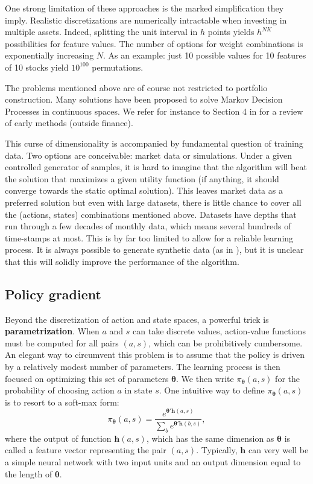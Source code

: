 \documentclass[]{krantz}
\theoremstyle{definition}
\theoremstyle{definition}
\theoremstyle{definition}
\theoremstyle{remark}
\begin{document}
One strong limitation of these approaches is the marked simplification
they imply. Realistic discretizations are numerically intractable when
investing in multiple assets. Indeed, splitting the unit interval in
\(h\) points yields \(h^{NK}\) possibilities for feature values. The
number of options for weight combinations is exponentially increasing
\(N\). As an example: just 10 possible values for 10 features of 10
stocks yield \(10^{100}\) permutations.

The problems mentioned above are of course not restricted to portfolio
construction. Many solutions have been proposed to solve Markov Decision
Processes in continuous spaces. We refer for instance to Section 4 in
\citet{powell2011review} for a review of early methods (outside
finance).

This curse of dimensionality is accompanied by fundamental question of
training data. Two options are conceivable: market data or simulations.
Under a given controlled generator of samples, it is hard to imagine
that the algorithm will beat the solution that maximizes a given utility
function (if anything, it should converge towards the static optimal
solution). This leaves market data as a preferred solution but even with
large datasets, there is little chance to cover all the (actions,
states) combinations mentioned above. Datasets have depths that run
through a few decades of monthly data, which means several hundreds of
time-stamps at most. This is by far too limited to allow for a reliable
learning process. It is always possible to generate synthetic data (as
in \citet{yu2019model}), but it is unclear that this will solidly
improve the performance of the algorithm.

\hypertarget{policy-gradient}{%
\subsection{Policy gradient}\label{policy-gradient}}

Beyond the discretization of action and state spaces, a powerful trick
is \textbf{parametrization}. When \(a\) and \(s\) can take discrete
values, action-value functions must be computed for all pairs \((a,s)\),
which can be prohibitively cumbersome. An elegant way to circumvent this
problem is to assume that the policy is driven by a relatively modest
number of parameters. The learning process is then focused on optimizing
this set of parameters \(\boldsymbol{\theta}\). We then write
\(\pi_{\boldsymbol{\theta}}(a,s)\) for the probability of choosing
action \(a\) in state \(s\). One intuitive way to define
\(\pi_{\boldsymbol{\theta}}(a,s)\) is to resort to a soft-max form:
\begin{equation}
\label{eq:policyex}
\pi_{\boldsymbol{\theta}}(a,s) = \frac{e^{\boldsymbol{\theta}'\textbf{h}(a,s)}}{\sum_{b}e^{\boldsymbol{\theta}'\textbf{h}(b,s)}},
\end{equation} where the output of function \(\textbf{h}(a,s)\), which
has the same dimension as \(\boldsymbol{\theta}\) is called a feature
vector representing the pair \((a,s)\). Typically, \(\textbf{h}\) can
very well be a simple neural network with two input units and an output
dimension equal to the length of \(\boldsymbol{\theta}\).
\end{document}
